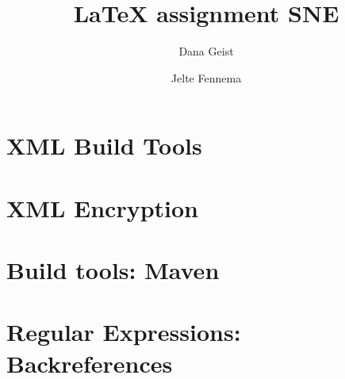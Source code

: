 \documentclass{report}
\title{\LaTeX{} assignment SNE}
\author{Dana Geist \and Jelte Fennema}
\begin{document}
\maketitle
\tableofcontents

\chapter{XML Build Tools}

\chapter{XML Encryption}

\chapter{Build tools: Maven}

\chapter{Regular Expressions: Backreferences}

\end{document}
